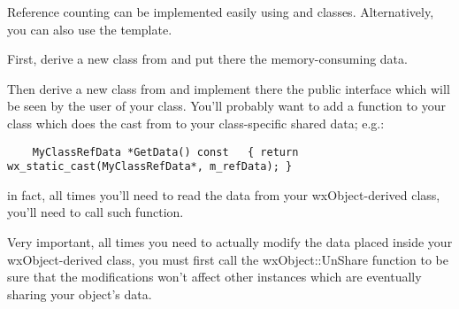 Reference counting can be implemented easily using 
and  classes. Alternatively, you
can also use the  template.

First, derive a new class from  and
put there the memory-consuming data.

Then derive a new class from  and implement there
the public interface which will be seen by the user of your class.
You'll probably want to add a function to your class which does the cast from
 to your class-specific shared data; e.g.:

\begin{verbatim}
    MyClassRefData *GetData() const   { return wx_static_cast(MyClassRefData*, m_refData); }
\end{verbatim}

in fact, all times you'll need to read the data from your wxObject-derived class,
you'll need to call such function.

Very important, all times you need to actually modify the data placed inside your
wxObject-derived class, you must first call the wxObject::UnShare
function to be sure that the modifications won't affect other instances which are
eventually sharing your object's data.

